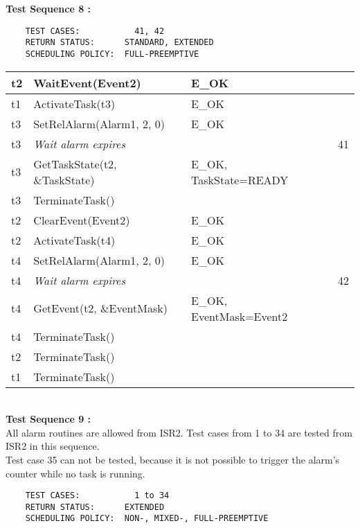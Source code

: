 \documentclass[10pt]{article}
\newlength{\Li}\settowidth{\Li}{Running}
\newlength{\Lii}\setlength{\Lii}{7cm}
\newlength{\Liiii}\setlength{\Liiii}{0.9cm}
\newlength{\Liii}\setlength{\Liii}{\textwidth} \addtolength{\Liii}{-\Li} \addtolength{\Liii}{-\Lii} \addtolength{\Liii}{-\Liiii}
\begin{document}
	\textbf{Test Sequence 8 :}
	\begin{lstlisting}
	TEST CASES:		      41, 42
	RETURN STATUS:	    STANDARD, EXTENDED
	SCHEDULING POLICY:  FULL-PREEMPTIVE
	\end{lstlisting}
	
	
	\begin{supertabular}{|p{\Li}|p{\Lii}|p{\Liii}|p{\Liiii}|} \hline 
	t2	& WaitEvent(Event2) 					& E\_OK					& \\ \hline
	t1	& ActivateTask(t3)						& E\_OK 					&\\ \hline
	t3	& SetRelAlarm(Alarm1, 2, 0)				& E\_OK					& \\ \hline
	t3	& \textit{Wait alarm expires}			 	& 						& 41 \\ \hline  
	t3	& GetTaskState(t2, \&TaskState)			& E\_OK, TaskState=READY	&\\ \hline
	t3	& TerminateTask()						&						& \\ \hline
	t2	& ClearEvent(Event2) 					& E\_OK					& \\ \hline
	t2	& ActivateTask(t4) 						& E\_OK					& \\ \hline
	t4	& SetRelAlarm(Alarm1, 2, 0) 				& E\_OK					& \\ \hline
	t4	& \textit{Wait alarm expires}			 	& 						& 42 \\ \hline  
	t4 	& GetEvent(t2, \&EventMask) 				& E\_OK, EventMask=Event2 	&\\ \hline
	t4 	& TerminateTask() 						& 						& \\ \hline 
	t2 	& TerminateTask() 						& 						& \\ \hline 
	t1 	& TerminateTask() 						& 						& \\ \hline 
	\end{supertabular} \\
	
	\textbf{Test Sequence 9 :}\\
	All alarm routines are allowed from ISR2. Test cases from 1 to 34 are tested from ISR2 in this sequence. \\ 
	Test case 35 can not be tested, because it is not possible to trigger the alarm’s counter while no task is running.
	\begin{lstlisting}
	TEST CASES:		      1 to 34
	RETURN STATUS:	    EXTENDED
	SCHEDULING POLICY:  NON-, MIXED-, FULL-PREEMPTIVE
	\end{lstlisting}
	
	
\end{document}
